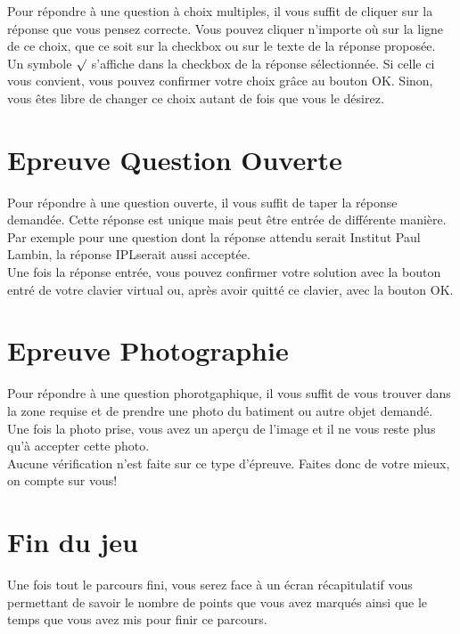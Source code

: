 \documentclass[11pt]{scrreprt}
\begin{document}
    Pour répondre à une question à choix multiples, il vous suffit de cliquer sur la réponse que vous pensez correcte. Vous pouvez cliquer n'importe où sur la ligne de ce choix, que ce soit sur la checkbox ou sur le texte de la réponse proposée.\\

    Un symbole $\surd$ s'affiche dans la checkbox de la réponse sélectionnée. Si celle ci vous convient, vous pouvez confirmer votre choix grâce au bouton OK. Sinon, vous êtes libre de changer ce choix autant de fois que vous le désirez.\\

    \section{Epreuve Question Ouverte}

    Pour répondre à une question ouverte, il vous suffit de taper la réponse demandée. Cette réponse est unique mais peut être entrée de différente manière. Par exemple pour une question dont la réponse attendu serait \og Institut Paul Lambin\fg, la réponse \og IPL\fg serait aussi acceptée.\\

    Une fois la réponse entrée, vous pouvez confirmer votre solution avec la bouton entré de votre clavier virtual ou, après avoir quitté ce clavier, avec la bouton OK.

    \section{Epreuve Photographie}

    Pour répondre à une question phorotgaphique, il vous suffit de vous trouver dans la zone requise et de prendre une photo du batiment ou autre objet demandé. Une fois la photo prise, vous avez un aperçu de l'image et il ne vous reste plus qu'à accepter cette photo.\\

    Aucune vérification n'est faite sur ce type d'épreuve. Faites donc de votre mieux, on compte sur vous!

    \section{Fin du jeu}
    Une fois tout le parcours fini, vous serez face à un écran récapitulatif vous permettant de savoir le nombre de points que vous avez marqués ainsi que le temps que vous avez mis pour finir ce parcours.\\
\end{document}
